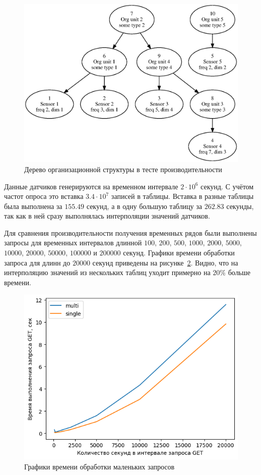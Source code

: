 \begin{figure}
    \includegraphics[scale=0.6]{../img/bench.eps}
    \caption{Дерево организационной структуры в тесте производительности}
    \label{bench-graph}
\end{figure}

Данные датчиков генерируются на временном интервале $2 \cdot {10} ^ {6}$ секунд. С учётом частот опроса это вставка $3.4 \cdot {10} ^ {7}$ записей в таблицы. Вставка в разные таблицы была выполнена за $155.49$ секунд, а в одну большую таблицу за $262.83$ секунды, так как в ней сразу выполнялась интерполяции значений датчиков.

Для сравнения производительности получения временных рядов были выполнены запросы для временных интервалов длинной $100$, $200$, $500$, $1000$, $2000$, $5000$, $10000$, $20000$, $50000$, $100000$ и $200000$ секунд. Графики времени обработки запроса для длинн до $20000$ секунд приведены на рисунке~\ref{bench2e4}. Видно, что на интерполяцию значений из нескольких таблиц уходит примерно на $20\%$ больше времени.

\begin{figure}
    \includegraphics[scale=1.0]{../img/bench2e4.png}
    \caption{Графики времени обработки маленьких запросов}
    \label{bench2e4}
\end{figure}

